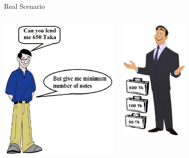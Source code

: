 

\begin{frame}{Real Scenario}
    \begin{columns}
        
        \begin{center}
            \includegraphics[height=7cm]{figures/poorperson3.jpg}
        \end{center}
        
        
        
        \begin{center}
            \includegraphics[height=6cm]{figures/richperson2.jpg}
        \end{center}
        
        
    \end{columns}
        
\end{frame}
